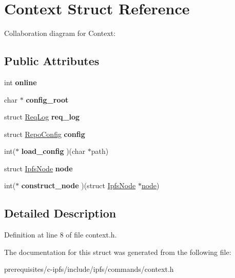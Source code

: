 \hypertarget{struct_context}{}\section{Context Struct Reference}
\label{struct_context}


Collaboration diagram for Context\+:
\subsection*{Public Attributes}
\begin{DoxyCompactItemize}
\item 
\mbox{\label{struct_context_af270f46af5006dc7bd7a9e1006dc0535}} 
int {\bfseries online}
\item 
\mbox{\label{struct_context_a7957b5ada33df696f5d6a119cefcc71e}} 
char $\ast$ {\bfseries config\+\_\+root}
\item 
\mbox{\label{struct_context_a5653cee139855b48676050f2a6286bea}} 
struct \mbox{\hyperlink{struct_req_log}{Req\+Log}} {\bfseries req\+\_\+log}
\item 
\mbox{\label{struct_context_a9db48edd5b7b76bea70917278a22d5ba}} 
struct \mbox{\hyperlink{struct_repo_config}{Repo\+Config}} {\bfseries config}
\item 
\mbox{\label{struct_context_af379756b9df40afc8f0e9fd946c2b802}} 
int($\ast$ {\bfseries load\+\_\+config} )(char $\ast$path)
\item 
\mbox{\label{struct_context_a30627734ca260f32c0e86d80ba936371}} 
struct \mbox{\hyperlink{struct_ipfs_node}{Ipfs\+Node}} {\bfseries node}
\item 
\mbox{\label{struct_context_a90e465201cc7a055160123641b143c32}} 
int($\ast$ {\bfseries construct\+\_\+node} )(struct \mbox{\hyperlink{struct_ipfs_node}{Ipfs\+Node}} $\ast$\mbox{\hyperlink{structnode}{node}})
\end{DoxyCompactItemize}


\subsection{Detailed Description}


Definition at line 8 of file context.\+h.



The documentation for this struct was generated from the following file\+:\begin{DoxyCompactItemize}
\item 
prerequisites/c-\/ipfs/include/ipfs/commands/context.\+h\end{DoxyCompactItemize}
